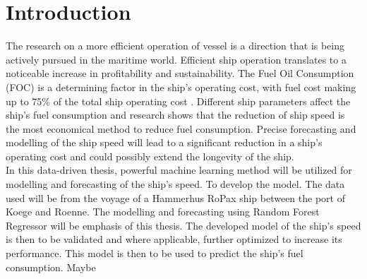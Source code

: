 \section{Introduction} \label{introduction}

The research on a more efficient operation of vessel is a direction that is being actively pursued in the maritime world. 
Efficient ship operation translates to a noticeable increase in profitability and sustainability. 
The Fuel Oil Consumption (FOC) is a determining factor in the ship's operating cost, with fuel cost making up to 75\% of the total ship operating cost \cite{Abebe.2020,Gkerekos.2019}. 
Different ship parameters affect the ship's fuel consumption and research shows that the reduction of ship speed is the most economical method to reduce fuel consumption. 
Precise forecasting and modelling of the ship speed will lead to a significant reduction in a ship's operating cost and could possibly extend the longevity of the ship. \\

In this data-driven thesis, powerful machine learning method will be utilized for modelling and forecasting of the ship's speed. To develop the model. 
The data used will be from the voyage of a Hammerhus RoPax ship between the port of Koege and Roenne. 
The modelling and forecasting using Random Forest Regressor will be emphasis of this thesis. The developed model of the ship's speed is then to be validated and where applicable, 
further optimized to increase its performance. 
This model is then to be used to predict the ship's fuel consumption. Maybe




